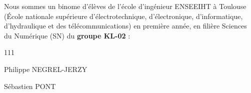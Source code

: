 Nous sommes un binome d'élèves de l'école d'ingénieur ENSEEIHT à Toulouse 
(École nationale supérieure d'électrotechnique, d'électronique, d'informatique, d'hydraulique 
et des télécommunications) en première année, en filière Sciences du Numérique (SN) du \textbf{groupe KL-02} :
\\
\begin{dinglist}{111}
   \item Philippe NEGREL-JERZY
   \item Sébastien PONT
\end{dinglist}
